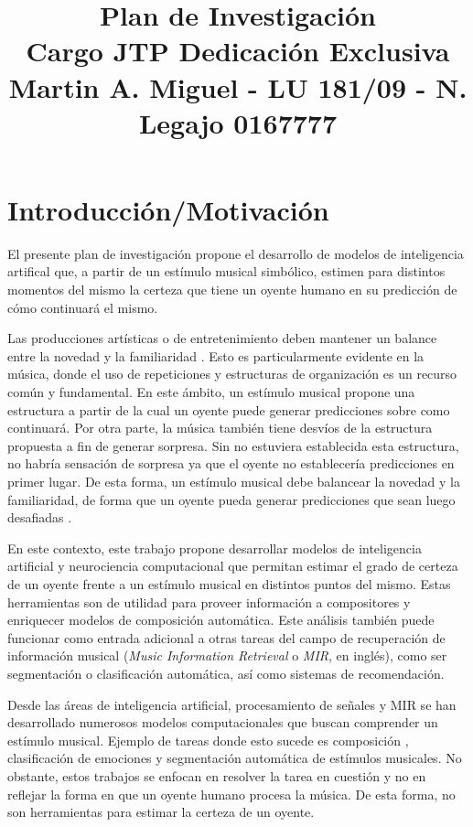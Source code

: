 \documentclass[a4paper,11pt]{article}
\title{\vspace{-3cm}Plan de Investigación  \\ Cargo JTP Dedicación Exclusiva \\
{\large Martin A. Miguel - LU 181/09 - N. Legajo 0167777}}
\date{}
\begin{document}
\maketitle

\vspace{-2cm}
\section*{Introducción/Motivación} 

El presente plan de investigación propone el desarrollo de modelos de
inteligencia artifical que, a partir de un estímulo musical simbólico, estimen
para distintos momentos del mismo la certeza que tiene un oyente humano en su
predicción de cómo continuará el mismo.

Las producciones artísticas o de entretenimiento deben mantener un balance
entre la novedad y la familiaridad \cite{berlyne1971aesthetics}. Esto es
particularmente evidente en la música, donde el uso de repeticiones y
estructuras de organización es un recurso común y fundamental. En este ámbito,
un estímulo musical propone una estructura a partir de la cual un oyente puede
generar predicciones sobre como continuará. Por otra parte, la música también
tiene desvíos de la estructura propuesta a fin de generar sorpresa. Sin no
estuviera establecida esta estructura, no habría sensación de sorpresa ya que
el oyente no establecería predicciones en primer lugar.  De esta forma, un
estímulo musical debe balancear la novedad y la familiaridad, de forma que un
oyente pueda generar predicciones que sean luego desafiadas
\cite{huron2010musical, vuust2018incongruity}.

En este contexto, este trabajo propone desarrollar modelos de inteligencia
artificial y neurociencia computacional que permitan estimar el grado de certeza
de un oyente frente a un estímulo musical en distintos puntos del mismo.
Estas herramientas son de utilidad para proveer información a compositores y
enriquecer modelos de composición automática. Este análisis también puede
funcionar como entrada adicional a otras tareas del campo de recuperación de
información musical (\emph{Music Information Retrieval} o \emph{MIR}, en
inglés), como ser segmentación o clasificación automática, así como sistemas de
recomendación.

Desde las áreas de inteligencia artificial, procesamiento de señales y MIR se
han desarrollado numerosos modelos computacionales que buscan comprender un
estímulo musical. Ejemplo de tareas donde esto sucede es composición
\cite{briot2020deep}, clasificación de emociones \cite{downie2008mood} y
segmentación automática \cite{mcfee2017evaluating} de estímulos musicales. No
obstante, estos trabajos se enfocan en resolver la tarea en cuestión y no
en reflejar la forma en que un oyente humano procesa la música. De esta forma,
no son herramientas para estimar la certeza de un oyente. 
\end{document}
